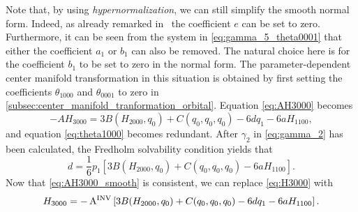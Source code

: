 Note that, by using \emph{hypernormalization}, we can still simplify the smooth
normal form. Indeed, as already remarked in~\cite{Kuznetsov2005practical} the
coefficient $e$ can be set to zero.  Furthermore, it can be seen from the
system in \cref{eq:gamma_5_theta0001} that either the coefficient $a_1$ or
$b_1$ can also be removed. The natural choice here is for the coefficient $b_1$
to be set to zero in the normal form. The parameter-dependent center manifold
transformation in this situation is obtained by first setting the coefficients
$\theta_{1000}$ and $\theta_{0001}$ to zero in
\cref{subsec:center_manifold_tranformation_orbital}. Equation \cref{eq:AH3000}
becomes
\begin{equation}
    \label{eq:AH3000_smooth}
    -A H_{3000} = 3 B(H_{2000},q_0) + C(q_0,q_0,q_0) - 6d q_1 - 6a H_{1100},
\end{equation}
and equation \cref{eq:theta1000} becomes redundant. After $\gamma_2$ in
\cref{eq:gamma_2} has been calculated, the Fredholm solvability condition yields
that
\begin{equation*}
    d = \frac16 p_1 \left[ 3B(H_{2000},q_0) + C(q_0,q_0,q_0)  - 6 a H_{1100}\right].
\end{equation*}
Now that \cref{eq:AH3000_smooth} is consistent, we can replace \cref{eq:H3000}
with
\begin{equation*}
	H_{3000} = -\operatorname{A^{\text{INV}}} \left[ 3B(H_{2000},q_0) + C(q_0,q_0,q_0) - 6dq_1 - 6a H_{1100} \right].
\end{equation*}

